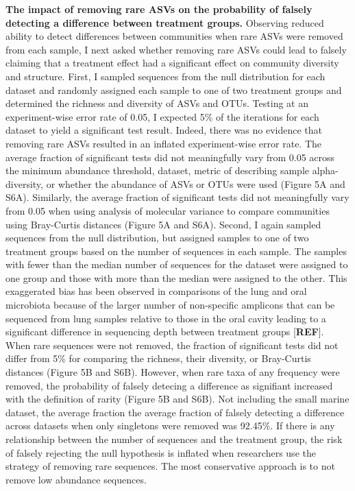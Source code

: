 \documentclass[]{article}
\begin{document}
\textbf{The impact of removing rare ASVs on the probability of falsely
detecting a difference between treatment groups.} Observing reduced
ability to detect differences between communities when rare ASVs were
removed from each sample, I next asked whether removing rare ASVs could
lead to falsely claiming that a treatment effect had a significant
effect on community diversity and structure. First, I sampled sequences
from the null distribution for each dataset and randomly assigned each
sample to one of two treatment groups and determined the richness and
diversity of ASVs and OTUs. Testing at an experiment-wise error rate of
0.05, I expected 5\% of the iterations for each dataset to yield a
significant test result. Indeed, there was no evidence that removing
rare ASVs resulted in an inflated experiment-wise error rate. The
average fraction of significant tests did not meaningfully vary from
0.05 across the minimum abundance threshold, dataset, metric of
describing sample alpha-diversity, or whether the abundance of ASVs or
OTUs were used (Figure 5A and S6A). Similarly, the average fraction of
significant tests did not meaningfully vary from 0.05 when using
analysis of molecular variance to compare communities using Bray-Curtis
distances (Figure 5A and S6A). Second, I again sampled sequences from
the null distribution, but assigned samples to one of two treatment
groups based on the number of sequences in each sample. The samples with
fewer than the median number of sequences for the dataset were assigned
to one group and those with more than the median were assigned to the
other. This exaggerated bias has been observed in comparisons of the
lung and oral microbiota because of the larger number of non-specific
amplicons that can be sequenced from lung samples relative to those in
the oral cavity leading to a significant difference in sequencing depth
between treatment groups {[}\textbf{REF}{]}. When rare sequences were
not removed, the fraction of significant tests did not differ from 5\%
for comparing the richness, their diversity, or Bray-Curtis distances
(Figure 5B and S6B). However, when rare taxa of any frequency were
removed, the probability of falsely detecing a difference as signifiant
increased with the definition of rarity (Figure 5B and S6B). Not
including the small marine dataset, the average fraction the average
fraction of falsely detecting a difference across datasets when only
singletons were removed was 92.45\%. If there is any relationship
between the number of sequences and the treatment group, the risk of
falsely rejecting the null hypothesis is inflated when researchers use
the strategy of removing rare sequences. The most conservative approach
is to not remove low abundance sequences.
\end{document}
